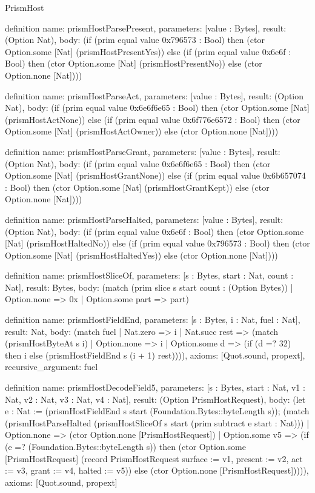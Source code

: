 \begin{lexlean}{PrismHost}
\begin{semanticmodule}
definition{
  name: prismHostParsePresent,
  parameters: [value : Bytes],
  result: (Option Nat),
  body: (if (prim equal value 0x796573 : Bool) then (ctor Option.some [Nat] (prismHostPresentYes)) else (if (prim equal value 0x6e6f : Bool) then (ctor Option.some [Nat] (prismHostPresentNo)) else (ctor Option.none [Nat])))
}

definition{
  name: prismHostParseAct,
  parameters: [value : Bytes],
  result: (Option Nat),
  body: (if (prim equal value 0x6e6f6e65 : Bool) then (ctor Option.some [Nat] (prismHostActNone)) else (if (prim equal value 0x6f776e6572 : Bool) then (ctor Option.some [Nat] (prismHostActOwner)) else (ctor Option.none [Nat])))
}

definition{
  name: prismHostParseGrant,
  parameters: [value : Bytes],
  result: (Option Nat),
  body: (if (prim equal value 0x6e6f6e65 : Bool) then (ctor Option.some [Nat] (prismHostGrantNone)) else (if (prim equal value 0x6b657074 : Bool) then (ctor Option.some [Nat] (prismHostGrantKept)) else (ctor Option.none [Nat])))
}

definition{
  name: prismHostParseHalted,
  parameters: [value : Bytes],
  result: (Option Nat),
  body: (if (prim equal value 0x6e6f : Bool) then (ctor Option.some [Nat] (prismHostHaltedNo)) else (if (prim equal value 0x796573 : Bool) then (ctor Option.some [Nat] (prismHostHaltedYes)) else (ctor Option.none [Nat])))
}

definition{
  name: prismHostSliceOf,
  parameters: [s : Bytes, start : Nat, count : Nat],
  result: Bytes,
  body: (match (prim slice s start count : (Option Bytes))
    | Option.none => 0x
    | Option.some part => part)
}

definition{
  name: prismHostFieldEnd,
  parameters: [s : Bytes, i : Nat, fuel : Nat],
  result: Nat,
  body: (match fuel
    | Nat.zero => i
    | Nat.succ rest => (match (prismHostByteAt s i)
      | Option.none => i
      | Option.some d => (if (d =? 32) then i else (prismHostFieldEnd s (i + 1) rest)))),
  axioms: [Quot.sound, propext],
  recursive_argument: fuel
}

definition{
  name: prismHostDecodeField5,
  parameters: [s : Bytes, start : Nat, v1 : Nat, v2 : Nat, v3 : Nat, v4 : Nat],
  result: (Option PrismHostRequest),
  body: (let e : Nat := (prismHostFieldEnd s start (Foundation.Bytes::byteLength s)); (match (prismHostParseHalted (prismHostSliceOf s start (prim subtract e start : Nat)))
    | Option.none => (ctor Option.none [PrismHostRequest])
    | Option.some v5 => (if (e =? (Foundation.Bytes::byteLength s)) then (ctor Option.some [PrismHostRequest] (record PrismHostRequest {surface := v1, present := v2, act := v3, grant := v4, halted := v5})) else (ctor Option.none [PrismHostRequest])))),
  axioms: [Quot.sound, propext]
}


\end{semanticmodule}
\end{lexlean}

